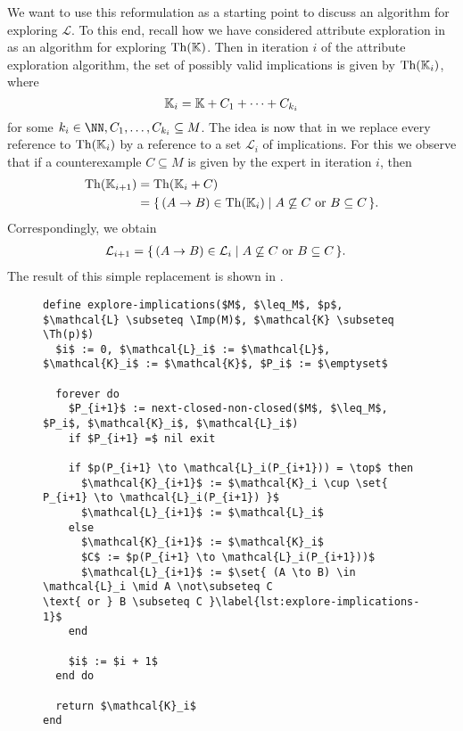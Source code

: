 We want to use this reformulation as a starting point to discuss an algorithm for
exploring $\mathcal{L}$.  To this end, recall how we have considered attribute exploration
in  as an algorithm for exploring $\operatorname{Th}({\mathbb{K}})$.  Then in
iteration $i$ of the attribute exploration algorithm, the set of possibly valid
implications is given by $\operatorname{Th}({\mathbb{K}}_{i})$, where
\begin{equation*}
  {\ensuremath{\mathbb{K}}}_{i} = {\mathbb{K}} + C_{1} + \dots + C_{k_{i}}
\end{equation*}
for some $k_{i} \in \NN, C_{1}, \dots, C_{k_{i}} \subseteq M$.  The idea is now that in
 we replace every reference to
$\operatorname{Th}({\mathbb{K}}_{i})$ by a reference to a set $\mathcal{L}_{i}$ of implications.  For this we
observe that if a counterexample $C \subseteq M$ is given by the expert in iteration $i$,
then
\begin{align*}
  \operatorname{Th}({\mathbb{K}}_{i+1})
  &= \operatorname{Th}({\mathbb{K}}_{i} + C) \\
  &= {\{\, (A \to B) \in \operatorname{Th}({\mathbb{K}}_{i}) \mid A \not\subseteq C \text{ or } B \subseteq C \,\}}.
\end{align*}
Correspondingly, we obtain
\begin{align*}
  \mathcal{L}_{i+1}
  &= {\{\, (A \to B) \in \mathcal{L}_{i} \mid A \not\subseteq C \text{ or } B \subseteq C \,\}}.
\end{align*}
The result of this simple replacement is shown in .


\begin{figure}[tp]
  \centering
  \begin{Algorithm}
    \label{alg:explore-implications}
    \hspace*{0cm}
\begin{lstlisting}
define explore-implications($M$, $\leq_M$, $p$, $\mathcal{L} \subseteq \Imp(M)$, $\mathcal{K} \subseteq \Th(p)$)
  $i$ := 0, $\mathcal{L}_i$ := $\mathcal{L}$, $\mathcal{K}_i$ := $\mathcal{K}$, $P_i$ := $\emptyset$

  forever do
    $P_{i+1}$ := next-closed-non-closed($M$, $\leq_M$, $P_i$, $\mathcal{K}_i$, $\mathcal{L}_i$)
    if $P_{i+1} =$ nil exit

    if $p(P_{i+1} \to \mathcal{L}_i(P_{i+1})) = \top$ then
      $\mathcal{K}_{i+1}$ := $\mathcal{K}_i \cup \set{ P_{i+1} \to \mathcal{L}_i(P_{i+1}) }$
      $\mathcal{L}_{i+1}$ := $\mathcal{L}_i$
    else
      $\mathcal{K}_{i+1}$ := $\mathcal{K}_i$
      $C$ := $p(P_{i+1} \to \mathcal{L}_i(P_{i+1}))$
      $\mathcal{L}_{i+1}$ := $\set{ (A \to B) \in \mathcal{L}_i \mid A \not\subseteq C
\text{ or } B \subseteq C }\label{lst:explore-implications-1}$
    end

    $i$ := $i + 1$
  end do

  return $\mathcal{K}_i$  
end
\end{lstlisting}
  \end{Algorithm}
\end{figure}

